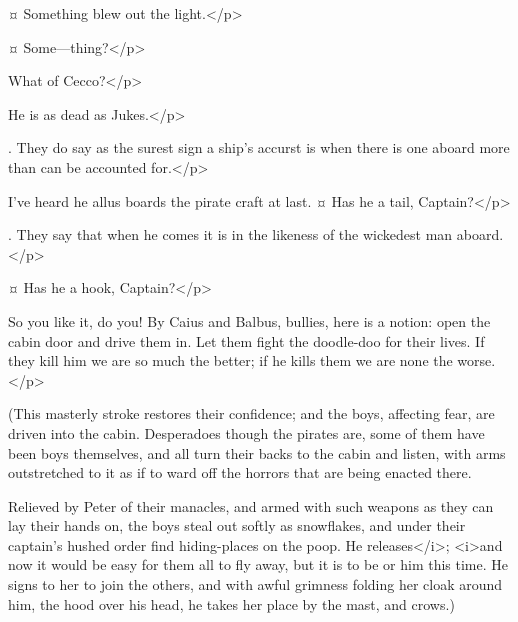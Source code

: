 \begin{drama}
\hookspeaks {}¤
Something blew out the light.</p>

\mullinsspeaks {}¤
Some—thing?</p>

\noodlerspeaks
What of Cecco?</p>

\hookspeaks
He is as dead as Jukes.</p>


\cooksonspeaks.
They do say as the surest sign a ship's accurst is when there is one aboard more than can be accounted for.</p>

\noodlerspeaks
I've heard he allus boards the pirate craft at last.
¤
Has he a tail, Captain?</p>

\mullinsspeaks.
They say that when he comes it is in the likeness of the wickedest man aboard.</p>

\cooksonspeaks {}¤
Has he a hook, Captain?</p>


\hookspeaks
So you like it, do you!
By Caius and Balbus, bullies, here is a notion: open the cabin door and drive them in.
Let them fight the doodle-doo for their lives.
If they kill him we are so much the better; if he kills them we are none the worse.</p>

\begin{stagedir}
(This masterly stroke restores their confidence; and the boys, affecting fear, are driven into the cabin.
Desperadoes though the pirates are, some of them have been boys themselves, and all turn their backs to the cabin and listen, with arms outstretched to it as if to ward off the horrors that are being enacted there.

Relieved by Peter of their manacles, and armed with such weapons as they can lay their hands on, the boys steal out softly as snowflakes, and under their captain's hushed order find hiding-places on the poop.
He releases</i>\wendy; <i>and now it would be easy for them all to fly away, but it is to be \hook or him this time.
He signs to her to join the others, and with awful grimness folding her cloak around him, the hood over his head, he takes her place by the mast, and crows.)
\end{stagedir}


\end{drama}

